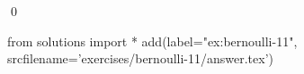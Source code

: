 
\begin{ex} 
  \label{ex:bernoulli-11}
  
  \qed
\end{ex} 
\begin{python0}
from solutions import *
add(label="ex:bernoulli-11",
    srcfilename='exercises/bernoulli-11/answer.tex') 
\end{python0}
